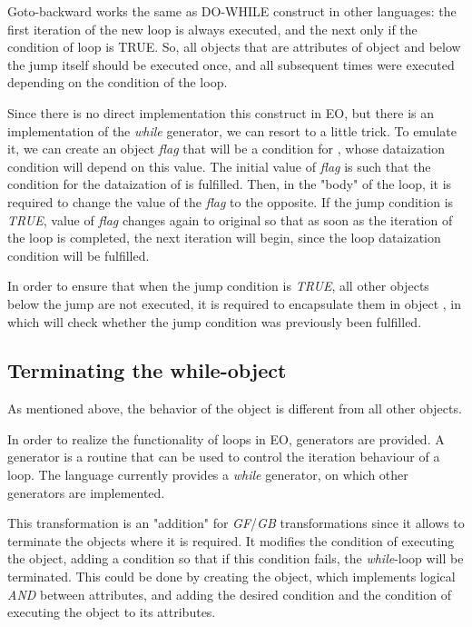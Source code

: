 \documentclass[sigplan,review,11pt,nonacm,natbib=false]{acmart}
\theoremstyle{theorems}
\begin{document}
    Goto-backward works the same as DO-WHILE construct in other languages: the first iteration of the new loop is always executed, and the next only if the condition of loop is TRUE.
    So, all objects that are attributes of object  and below the jump itself should be executed once, and all subsequent times were executed depending on the condition of the loop.

    Since there is no direct implementation this construct in EO, but there is an implementation of the \emph{while} generator, we can resort to a little trick.
    To emulate it, we can create an object \emph{flag} that will be a condition for , whose dataization condition will depend on this value.
    The initial value of \emph{flag} is such that the condition for the dataization of  is fulfilled.
    Then, in the "body" of the loop, it is required to change the value of the \emph{flag} to the opposite.
    If the jump condition is \emph{TRUE}, value of \emph{flag} changes again to original so that as soon as the iteration of the loop is completed, the next iteration will begin, since the loop dataization condition will be fulfilled.

    In order to ensure that when the jump condition is \emph{TRUE}, all other objects below the jump are not executed, it is required to encapsulate them in object , in which will check whether the jump condition was previously been fulfilled.




    \subsection{Terminating the while-object} \label{TW}
    As mentioned above, the behavior of the  object is different from all other objects.

    In order to realize the functionality of loops in EO, generators are provided. A generator is a routine that can be used to control the iteration behaviour of a loop.
    The language currently provides a \emph{while} generator, on which other generators are implemented.

    This transformation is an "addition" for \emph{GF}/\emph{GB} transformations since it allows to terminate the  objects where it is required.
    It modifies the condition of executing the  object, adding a condition so that if this condition fails, the \emph{while}-loop will be terminated.
    This could be done by creating the  object, which implements logical \emph{AND} between attributes, and adding the desired condition and the condition of executing the  object to its attributes.
\end{document}
